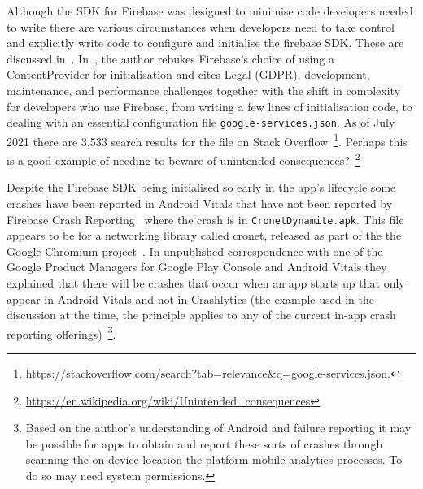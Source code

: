 \label{Firebase-SDK-ContentProvider}
Although the SDK for Firebase was designed to minimise code developers needed to write there are various circumstances when developers need to take control and explicitly write code to configure and initialise the firebase SDK. These are discussed in~\citep{firebaseblog2017_take_control_of_your_firebase_init_on_android}. In~\citep{techyourchance2021_contentprovider_in_android_libraries_considered_harmful}, the author rebukes Firebase's choice of using a ContentProvider for initialisation and cites Legal (GDPR), development, maintenance, and performance challenges together with the shift in complexity for developers who use Firebase, from writing a few lines of initialisation code, to dealing with an essential configuration file \texttt{google-services.json}. As of  July 2021 there are 3,533 search results for the file on Stack Overflow~\footnote{\url{https://stackoverflow.com/search?tab=relevance&q=google-services.json}.}. Perhaps this is a good example of needing to beware of unintended consequences?~\footnote{\url{https://en.wikipedia.org/wiki/Unintended_consequences}}

Despite the Firebase SDK being initialised so early in the app's lifecycle some crashes have been reported in Android Vitals that have not been reported by Firebase Crash Reporting~\citep{so2021_shankar_strange_crash_in_cronetDynamite.apk} where the crash is in \texttt{CronetDynamite.apk}. This file appears to be for a networking library called cronet, released as part of the the Google Chromium project~\citep{android_cronet_library}. In unpublished correspondence with one of the Google Product Managers for Google Play Console and Android Vitals they explained that there will be crashes that occur when an app starts up that only appear in Android Vitals and not in Crashlytics (the example used in the discussion at the time, the principle applies to any of the current in-app crash reporting offerings)~\footnote{Based on the author's understanding of Android and failure reporting it may be possible for apps to obtain and report these sorts of crashes through scanning the on-device location the platform mobile analytics processes. To do so may need system permissions.}.

